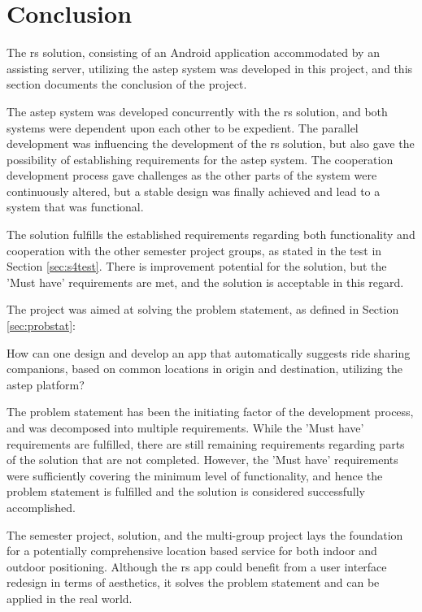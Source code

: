 \section{Conclusion}
The \gls{rs} solution, consisting of an Android application accommodated by an assisting server, utilizing the \gls{astep} system was developed in this project, and this section documents the conclusion of the project.


The \gls{astep} system was developed concurrently with the \gls{rs} solution, and both systems were dependent upon each other to be expedient.
The parallel development was influencing the development of the \gls{rs} solution, but also gave the possibility of establishing requirements for the \gls{astep} system.
The cooperation development process gave challenges as the other parts of the system were continuously altered, but a stable design was finally achieved and lead to a system that was functional.


The solution fulfills the established requirements regarding both functionality and cooperation with the other semester project groups, as stated in the test in Section \ref{sec:s4test}.
There is improvement potential for the solution, but the 'Must have' requirements are met, and the solution is acceptable in this regard.


The project was aimed at solving the problem statement, as defined in Section \ref{sec:probstat}:

{\addtolength{\leftskip}{10mm}\addtolength{\rightskip}{10mm}\noindent\hrulefill\it
	
	\noindent How can one design and develop an app that automatically suggests ride sharing companions, based on common locations in origin and destination, utilizing the \gls{astep} platform? 
	
	\noindent\hrulefill
	
}

The problem statement has been the initiating factor of the development process, and was decomposed into multiple requirements.
While the 'Must have' requirements are fulfilled, there are still remaining requirements regarding parts of the solution that are not completed.
However, the 'Must have' requirements were sufficiently covering the minimum level of functionality, and hence the problem statement is fulfilled and the solution is considered successfully accomplished.


The semester project, solution, and the multi-group project lays the foundation for a potentially comprehensive location based service for both indoor and outdoor positioning.
Although the \gls{rs} app could benefit from a user interface redesign in terms of aesthetics, it solves the problem statement and can be applied in the real world.